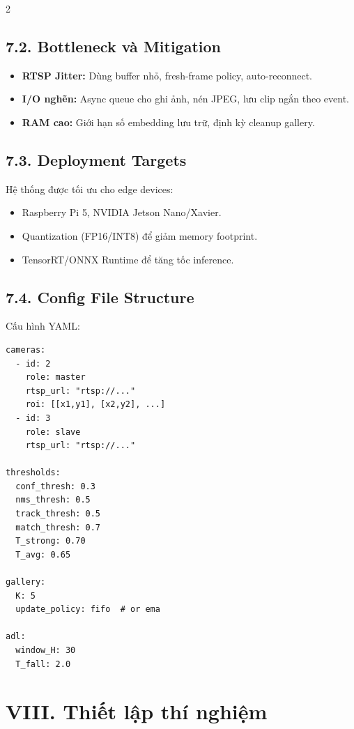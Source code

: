 \documentclass[a4paper,13pt]{article}
\begin{document}
\begin{multicols}{2}
\subsection*{7.2. Bottleneck và Mitigation}
\begin{itemize}
    \item \textbf{RTSP Jitter:} Dùng buffer nhỏ, fresh-frame policy, auto-reconnect.
    \item \textbf{I/O nghẽn:} Async queue cho ghi ảnh, nén JPEG, lưu clip ngắn theo event.
    \item \textbf{RAM cao:} Giới hạn số embedding lưu trữ, định kỳ cleanup gallery.
\end{itemize}

\subsection*{7.3. Deployment Targets}
Hệ thống được tối ưu cho edge devices:
\begin{itemize}
    \item Raspberry Pi 5, NVIDIA Jetson Nano/Xavier.
    \item Quantization (FP16/INT8) để giảm memory footprint.
    \item TensorRT/ONNX Runtime để tăng tốc inference.
\end{itemize}

\subsection*{7.4. Config File Structure}
Cấu hình YAML:
\begin{verbatim}
cameras:
  - id: 2
    role: master
    rtsp_url: "rtsp://..."
    roi: [[x1,y1], [x2,y2], ...]
  - id: 3
    role: slave
    rtsp_url: "rtsp://..."

thresholds:
  conf_thresh: 0.3
  nms_thresh: 0.5
  track_thresh: 0.5
  match_thresh: 0.7
  T_strong: 0.70
  T_avg: 0.65

gallery:
  K: 5
  update_policy: fifo  # or ema

adl:
  window_H: 30
  T_fall: 2.0
\end{verbatim}

\section*{VIII. Thiết lập thí nghiệm}


\end{multicols}
\end{document}
